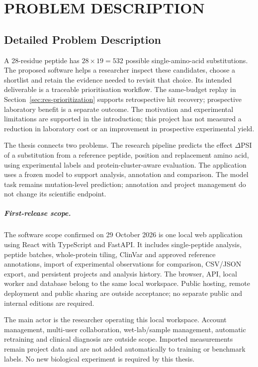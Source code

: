 \ThesisChapterNumbering
{}
\chapter{PROBLEM DESCRIPTION}\label{chap:problem}

\section{Detailed Problem Description}
A 28-residue peptide has $28\times19=532$ possible single-amino-acid substitutions. The proposed
software helps a researcher inspect these candidates, choose a shortlist and retain the evidence
needed to revisit that choice. Its intended deliverable is a traceable prioritisation workflow.
The same-budget replay in Section~\ref{sec:res-prioritization} supports retrospective hit recovery;
prospective laboratory benefit is a separate outcome.
The motivation and experimental limitations are supported in the introduction; this project has
not measured a reduction in laboratory cost or an improvement in prospective experimental yield.

The thesis connects two problems. The research pipeline predicts the effect $\Delta$PSI of a
substitution from a reference peptide, position and replacement amino acid, using experimental
labels and protein-cluster-aware evaluation. The application uses a frozen model to support
analysis, annotation and comparison. The model task remains mutation-level prediction; annotation
and project management do not change its scientific endpoint.

\paragraph{First-release scope.}
The software scope confirmed on 29 October 2026 is one local web application using React with
TypeScript and FastAPI. It includes single-peptide analysis, peptide batches, whole-protein tiling,
ClinVar and approved reference annotations, import of experimental observations for comparison,
CSV/JSON export, and persistent projects and analysis history. The browser, API, local worker and
database belong to the same local workspace. Public hosting, remote deployment and public sharing
are outside acceptance; no separate public and internal editions are required.

The main actor is the researcher operating this local workspace. Account management, multi-user
collaboration, wet-lab/sample management, automatic retraining and clinical diagnosis are outside
scope. Imported measurements remain project data and are not added automatically to training or
benchmark labels. No new biological experiment is required by this thesis.

